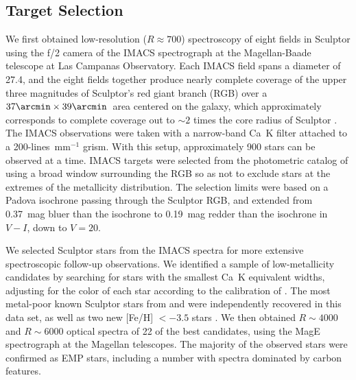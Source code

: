 \documentclass{emulateapj-rtx4}
\begin{document}
\subsection{Target Selection}
\label{sec:target}
\noindent

We first obtained low-resolution ($R \approx 700$) spectroscopy of
eight fields in Sculptor using the f/2 camera of the IMACS
spectrograph \citep{dbh+11} at the Magellan-Baade telescope at Las Campanas Observatory. Each 
IMACS field spans a diameter of 27.4\arcmin, and the eight fields together produce nearly
complete coverage of the upper three magnitudes of Sculptor's red giant
branch (RGB) over a $37\arcmin \times 39\arcmin$\ area centered on the
galaxy, which approximately corresponds to complete coverage out to $\sim2$ times the core radius of Sculptor \citep{b+07}.  
The IMACS observations were taken with a narrow-band Ca~K
filter attached to a 200-lines~mm$^{-1}$ grism.  With this setup,
approximately 900 stars can be observed at a time.  IMACS targets were
selected from the photometric catalog of \citet*{cdb+05} using a broad
window surrounding the RGB so as not to exclude stars at the extremes
of the metallicity distribution.  The selection limits were based on a
Padova isochrone \citep{mgb+08} passing through the Sculptor RGB, and
extended from 0.37~mag bluer than the isochrone to 0.19~mag redder
than the isochrone in $V-I$, down to $V = 20$.

We selected Sculptor stars from the IMACS spectra for more extensive spectroscopic follow-up
observations. We identified a sample of
low-metallicity candidates by searching for stars with the smallest
Ca~K equivalent widths, adjusting for the color of each star according
to the calibration of \citet{brn+99}.  The most metal-poor known
Sculptor stars from \citet{fks+10} and \citet{tjh+10} were
independently recovered in this data set, as well as two new [Fe/H] $< -3.5$ stars \citep{sjf+15}. 
We then obtained $R \sim 4000$ and $R \sim 6000$
optical spectra of 22 of the best candidates,
using the MagE spectrograph \citep{mbt+08} at the Magellan telescopes. The majority of the
observed stars were confirmed as EMP stars, including a
number with spectra dominated by carbon features.

\end{document}
